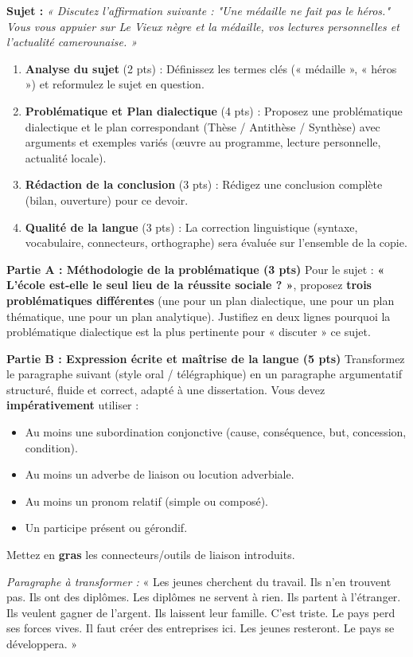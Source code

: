 \documentclass[11pt]{article}
\begin{document}
\begin{exercice}
\textbf{Sujet :} \textit{« Discutez l'affirmation suivante : "Une médaille ne fait pas le héros." Vous vous appuier sur Le Vieux nègre et la médaille, vos lectures personnelles et l'actualité camerounaise. »}

\begin{enumerate}
\item \textbf{Analyse du sujet} (2 pts) : Définissez les termes clés (« médaille », « héros ») et reformulez le sujet en question.
\item \textbf{Problématique et Plan dialectique} (4 pts) : Proposez une problématique dialectique et le plan correspondant (Thèse / Antithèse / Synthèse) avec arguments et exemples variés (œuvre au programme, lecture personnelle, actualité locale).
\item \textbf{Rédaction de la conclusion} (3 pts) : Rédigez une conclusion complète (bilan, ouverture) pour ce devoir.
\item \textbf{Qualité de la langue} (3 pts) : La correction linguistique (syntaxe, vocabulaire, connecteurs, orthographe) sera évaluée sur l'ensemble de la copie.
\end{enumerate}
\end{exercice}

\begin{exercice}
\textbf{Partie A : Méthodologie de la problématique (3 pts)}
Pour le sujet : \textbf{« L'école est-elle le seul lieu de la réussite sociale ? »}, proposez \textbf{trois problématiques différentes} (une pour un plan dialectique, une pour un plan thématique, une pour un plan analytique). Justifiez en deux lignes pourquoi la problématique dialectique est la plus pertinente pour « discuter » ce sujet.

\textbf{Partie B : Expression écrite et maîtrise de la langue (5 pts)}
Transformez le paragraphe suivant (style oral / télégraphique) en un paragraphe argumentatif structuré, fluide et correct, adapté à une dissertation. Vous devez \textbf{impérativement} utiliser :
\begin{itemize}
\item Au moins une subordination conjonctive (cause, conséquence, but, concession, condition).
\item Au moins un adverbe de liaison ou locution adverbiale.
\item Au moins un pronom relatif (simple ou composé).
\item Un participe présent ou gérondif.
\end{itemize}
Mettez en \textbf{gras} les connecteurs/outils de liaison introduits.

\textit{Paragraphe à transformer :}
« Les jeunes cherchent du travail. Ils n'en trouvent pas. Ils ont des diplômes. Les diplômes ne servent à rien. Ils partent à l'étranger. Ils veulent gagner de l'argent. Ils laissent leur famille. C'est triste. Le pays perd ses forces vives. Il faut créer des entreprises ici. Les jeunes resteront. Le pays se développera. »
\end{exercice}
\end{document}
